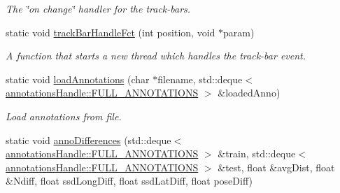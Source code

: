 \begin{DoxyCompactItemize}
\begin{DoxyCompactList}\small\item\em The \char`\"{}on change\char`\"{} handler for the track-\/bars. \item\end{DoxyCompactList}\item 
\hypertarget{classannotationsHandle_a6449c025574a5b0aae30a9b38fe598d6}{
static void \hyperlink{classannotationsHandle_a6449c025574a5b0aae30a9b38fe598d6}{trackBarHandleFct} (int position, void $\ast$param)}
\label{classannotationsHandle_a6449c025574a5b0aae30a9b38fe598d6}

\begin{DoxyCompactList}\small\item\em A function that starts a new thread which handles the track-\/bar event. \item\end{DoxyCompactList}\item 
\hypertarget{classannotationsHandle_a3eef5c1476c3e611a87a79d2ea36d2a4}{
static void \hyperlink{classannotationsHandle_a3eef5c1476c3e611a87a79d2ea36d2a4}{loadAnnotations} (char $\ast$filename, std::deque$<$ \hyperlink{structannotationsHandle_1_1FULL__ANNOTATIONS}{annotationsHandle::FULL\_\-ANNOTATIONS} $>$ \&loadedAnno)}
\label{classannotationsHandle_a3eef5c1476c3e611a87a79d2ea36d2a4}

\begin{DoxyCompactList}\small\item\em Load annotations from file. \item\end{DoxyCompactList}\item 
\hypertarget{classannotationsHandle_a0bc3693b8e7b5992494a915a73479435}{
static void \hyperlink{classannotationsHandle_a0bc3693b8e7b5992494a915a73479435}{annoDifferences} (std::deque$<$ \hyperlink{structannotationsHandle_1_1FULL__ANNOTATIONS}{annotationsHandle::FULL\_\-ANNOTATIONS} $>$ \&train, std::deque$<$ \hyperlink{structannotationsHandle_1_1FULL__ANNOTATIONS}{annotationsHandle::FULL\_\-ANNOTATIONS} $>$ \&test, float \&avgDist, float \&Ndiff, float ssdLongDiff, float ssdLatDiff, float poseDiff)}
\label{classannotationsHandle_a0bc3693b8e7b5992494a915a73479435}


\end{DoxyCompactItemize}
